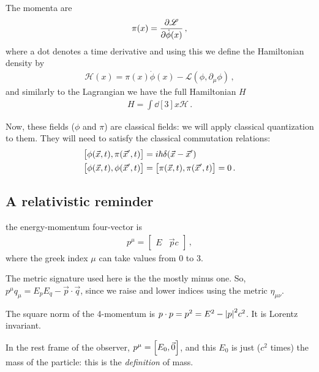 \documentclass[main.tex]{subfiles}
\begin{document}
The momenta are 
%
\begin{align}
\pi (x) = \pdv{\mathscr{L}}{\dot{\phi} (x)}
\,,
\end{align}
%
where a dot denotes a time derivative
and using this we define the Hamiltonian density by 
%
\begin{align}
\mathscr{H} (x) = \pi (x) \dot{\phi} (x) - \mathscr{L}(\phi, \partial_{\mu }\phi )
\,,
\end{align}
%
and similarly to the Lagrangian we have the full Hamiltonian \(H\)
%
\begin{align}
H = \int \dd[3]{x} \mathscr{H}
\,.
\end{align}

Now, these fields (\(\phi \) and \(\pi \)) are classical fields: we will apply classical quantization to them. 
They will need to satisfy the classical commutation relations: 
%
\begin{align}
\qty[\phi (\vec{x}, t), \pi (\vec{x}', t)] &= i \hbar \delta (\vec{x} - \vec{x}')  \\
\qty[\phi (\vec{x}, t), \phi  (\vec{x}', t)] &=
\qty[\pi (\vec{x}, t), \pi  (\vec{x}', t)] = 0
\,.
\end{align}
%

\subsection{A relativistic reminder}


the energy-momentum four-vector is 
%
\begin{align}
p^{\mu } = \left[\begin{array}{cccc}
E & \vec{p} c
\end{array}\right]
\,,
\end{align}
%
where the greek index \(\mu \) can take values from 0 to 3. 

The metric signature used here is the the mostly minus one. So, \(p^{\mu } q_{\mu } = E_{p} E_{q} - \vec{p} \cdot \vec{q}\), since we raise and lower indices using the metric \(\eta_{\mu \nu }\). 

The square norm of the 4-momentum is \(p \cdot p  = p^2 = E^2 - \abs{p}^2 c^2\). It is Lorentz invariant.

In the rest frame of the observer, \(p^{\mu } = \qty[E_{0}, \vec{0}]\), and this \(E_0\) is just (\(c^2\) times)
 the mass of the particle: this is the \emph{definition} of mass. 
\end{document}
